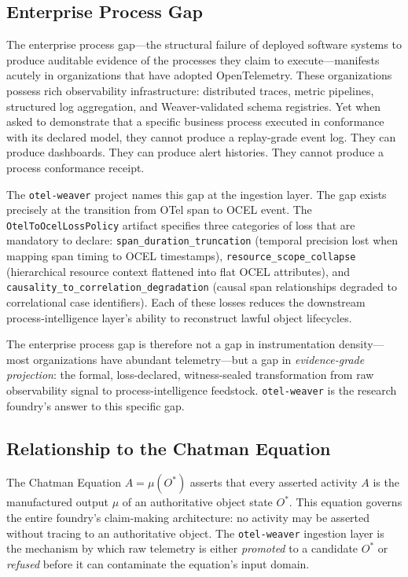 \subsection{Enterprise Process Gap}
\label{sec:otel-weaver-lineage-enterprise}

The enterprise process gap---the structural failure of deployed software systems to produce
auditable evidence of the processes they claim to execute---manifests acutely in organizations
that have adopted OpenTelemetry. These organizations possess rich observability infrastructure:
distributed traces, metric pipelines, structured log aggregation, and Weaver-validated schema
registries. Yet when asked to demonstrate that a specific business process executed in conformance
with its declared model, they cannot produce a replay-grade event log. They can produce dashboards.
They can produce alert histories. They cannot produce a process conformance receipt.

The \texttt{otel-weaver} project names this gap at the ingestion layer. The gap exists precisely
at the transition from OTel span to OCEL event. The \texttt{OtelToOcelLossPolicy} artifact
specifies three categories of loss that are mandatory to declare: \texttt{span\_duration\_truncation}
(temporal precision lost when mapping span timing to OCEL timestamps),
\texttt{resource\_scope\_collapse} (hierarchical resource context flattened into flat OCEL
attributes), and \texttt{causality\_to\_correlation\_degradation} (causal span relationships
degraded to correlational case identifiers). Each of these losses reduces the downstream
process-intelligence layer's ability to reconstruct lawful object lifecycles.

The enterprise process gap is therefore not a gap in instrumentation density---most organizations
have abundant telemetry---but a gap in \emph{evidence-grade projection}: the formal, loss-declared,
witness-sealed transformation from raw observability signal to process-intelligence feedstock.
\texttt{otel-weaver} is the research foundry's answer to this specific gap.

\subsection{Relationship to the Chatman Equation}
\label{sec:otel-weaver-lineage-chatman-equation}

The Chatman Equation $A = \mu(O^*)$ asserts that every asserted activity $A$ is the manufactured
output $\mu$ of an authoritative object state $O^*$. This equation governs the entire foundry's
claim-making architecture: no activity may be asserted without tracing to an authoritative object.
The \texttt{otel-weaver} ingestion layer is the mechanism by which raw telemetry is either
\emph{promoted} to a candidate $O^*$ or \emph{refused} before it can contaminate the equation's
input domain.

